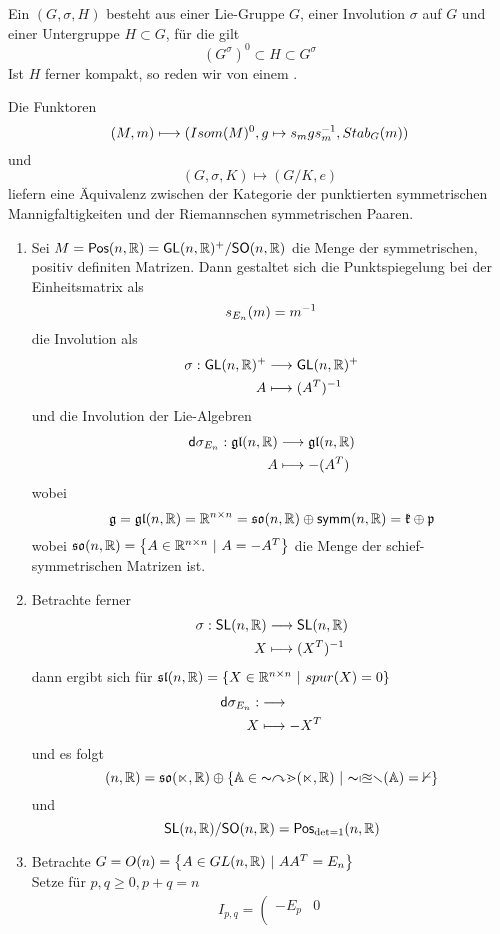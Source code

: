 \documentclass{book}
\renewcommand{\d}{\textsf{d}}
\newcommand{\g}{\mathfrak{g}}
\newcommand{\kf}{\mathfrak{k}}
\newcommand{\p}{\mathfrak{p}}
\newcommand{\GL}{\textsf{GL}(n,\R)}
\newcommand{\glf}{\mathfrak{gl}(n,\R)}
\newcommand{\SO}{\textsf{SO}(n,\R)}
\newcommand{\so}{\mathfrak{so}(n,\R)}
\newcommand{\SL}{\textsf{SL}(n,\R)}
\newcommand{\slf}{\mathfrak{sl}(n,\R)}
\newcommand{\POS}{\textsf{Pos}(n,\R)}
\newcommand{\symm}{\textsf{symm}(n,\R)}
\begin{document}
\Def{}
Ein  $(G, \sigma, H)$ besteht aus einer Lie-Gruppe $G$, einer Involution $\sigma$ auf $G$ und einer Untergruppe $H \subset G$, für die gilt
\[ (G^\sigma)^0 \subset H \subset G^\sigma \]
Ist $H$ ferner kompakt, so reden wir von einem .

\Bem{}
Die Funktoren
\[ (M, m) \longmapsto (Isom(M)^0, g \mapsto s_mgs_m^{-1}, Stab_G(m) ) \]
und
\[ (G, \sigma, K) \longmapsto (G/K, e) \]
liefern eine Äquivalenz zwischen der Kategorie der punktierten symmetrischen Mannigfaltigkeiten und der Riemannschen symmetrischen Paaren.

\Bsp{}
\begin{enumerate}[1.)]
\item Sei $M = \POS = \GL^+ /\SO$ die Menge der symmetrischen, positiv definiten Matrizen. Dann gestaltet sich die Punktspiegelung bei der Einheitsmatrix als
\[ s_{E_n}(m) = m^{-1} \]
die Involution als
\begin{align*}
\sigma : \GL^+ & \Pfeil{} \GL^+\\
A & \longmapsto (A^T)\i
\end{align*}
und die Involution der Lie-Algebren
\begin{align*}
\d\sigma_{E_n} : \glf & \Pfeil{} \glf\\
A & \longmapsto -(A^T)
\end{align*}
wobei
\[ \g = \glf = \R^{n\times n} = \so \oplus \symm = \kf \oplus \p \]
wobei $\so = \set{A \in \R^{n\times n}}{A = -A^T}$ die Menge der schief-symmetrischen Matrizen ist.
\item Betrachte ferner
\begin{align*}
\sigma : \SL & \Pfeil{} \SL\\
X & \longmapsto (X^T)\i
\end{align*}
dann ergibt sich für $\slf = \set{X \in \R^{n\times n}}{spur(X) = 0}$
\begin{align*}
\d\sigma_{E_n} : \sl & \Pfeil{} \sl\\
X & \longmapsto -X^T
\end{align*}
und es folgt
\[ \sl(n,\R) = \so \oplus \set{ A \in sym(n,\R) }{spur(A) = 0} \]
und
\[ \SL / \SO = \textsf{Pos}_{\det = 1} (n,\R) \]
\item Betrachte $G = O(n) = \set{A \in GL(n,\R)}{AA^T = E_n}$\\
Setze für $p,q \geq 0, p + q = n$
\begin{align*}
I_{p,q} = \left(
\begin{matrix}
-E_p & 0\\

\end{matrix}
\end{align*}
\end{enumerate}
\end{document}
